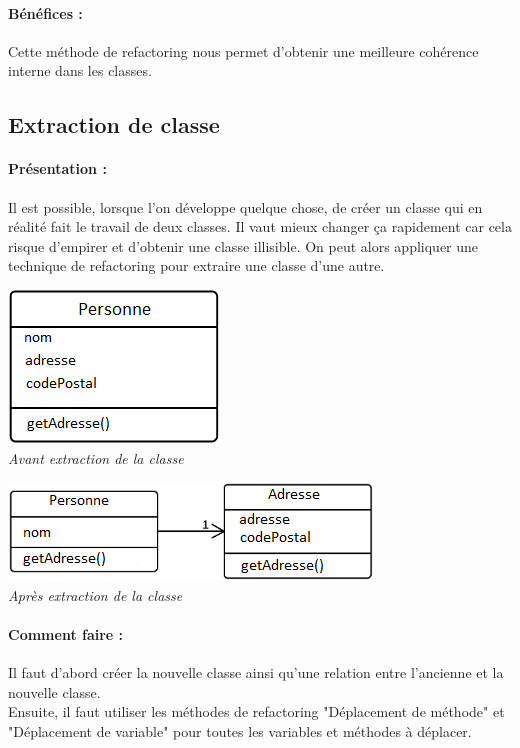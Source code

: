 \documentclass[a4paper,twoside,12pt,openright]{report}
\begin{document}
\paragraph{Bénéfices :}
Cette méthode de refactoring nous permet d'obtenir une meilleure cohérence interne dans les classes.

\subsection{Extraction de classe}
\paragraph{Présentation :}
Il est possible, lorsque l'on développe quelque chose, de créer un classe qui en réalité fait le travail de deux classes. Il vaut mieux changer ça rapidement car cela risque d'empirer et d'obtenir une classe illisible. On peut alors appliquer une technique de refactoring pour extraire une classe d'une autre.

\begin{center}
\includegraphics[scale=1]{Image/Extraction_Classe.png}\\
\itshape{Avant extraction de la classe}
\end{center}

\begin{center}
\includegraphics[scale=1]{Image/Extraction_Classe2.png}\\
\itshape{Après extraction de la classe}
\end{center}

\paragraph{Comment faire :}
Il faut d'abord créer la nouvelle classe ainsi qu'une relation entre l'ancienne et la nouvelle classe.\\
Ensuite, il faut utiliser les méthodes de refactoring "Déplacement de méthode" et "Déplacement de variable" pour toutes les variables et méthodes à déplacer.
\end{document}
